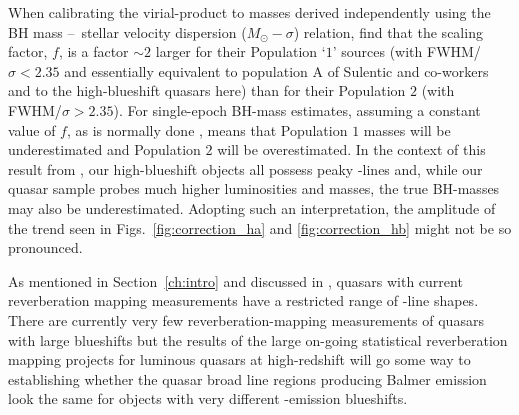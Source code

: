 When calibrating the virial-product to masses derived independently using the BH mass \---\ stellar velocity dispersion ($M_\odot-\sigma$) relation, \citet{collin06} find that the scaling factor, $f$, is a factor $\sim2$ larger for their Population `$1$' sources (with FWHM/$\sigma < 2.35$ and essentially equivalent to population A of Sulentic and co-workers and to the high-blueshift quasars here) than for their Population $2$ (with FWHM/$\sigma > 2.35$). 
For single-epoch BH-mass estimates, assuming a constant value of $f$, as is normally done \citep[e.g.][]{vestergaard06}, means that Population $1$ masses will be underestimated and Population $2$ will be overestimated.
In the context of this result from \citet{collin06}, our high-blueshift objects all possess peaky \hans-lines and, while our quasar sample probes much higher luminosities and masses, the true BH-masses may also be underestimated.
Adopting such an interpretation, the amplitude of the trend seen in Figs.~\ref{fig:correction_ha} and \ref{fig:correction_hb} might not be so pronounced.

As mentioned in Section~\ref{ch:intro} and discussed in \citet{richards11}, quasars with current reverberation mapping measurements have a restricted range of -line shapes. 
There are currently very few reverberation-mapping measurements of quasars with large  blueshifts but the results of the large on-going statistical reverberation mapping projects \citep[e.g.][]{shen15} for luminous quasars at high-redshift will go some way to establishing whether the quasar broad line regions producing Balmer emission look the same for objects with very different -emission blueshifts. 

